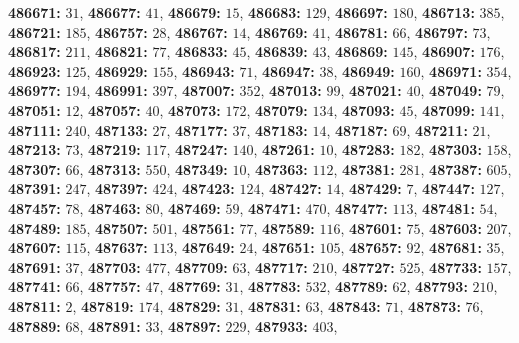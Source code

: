 \textsf{\bfseries 486671:} $31$, \textsf{\bfseries 486677:} $41$, \textsf{\bfseries 486679:} $15$, \textsf{\bfseries 486683:} $129$, \textsf{\bfseries 486697:} $180$, \textsf{\bfseries 486713:} $385$, \textsf{\bfseries 486721:} $185$, \textsf{\bfseries 486757:} $28$, \textsf{\bfseries 486767:} $14$, \textsf{\bfseries 486769:} $41$, \textsf{\bfseries 486781:} $66$, \textsf{\bfseries 486797:} $73$, \textsf{\bfseries 486817:} $211$, \textsf{\bfseries 486821:} $77$, \textsf{\bfseries 486833:} $45$, \textsf{\bfseries 486839:} $43$, \textsf{\bfseries 486869:} $145$, \textsf{\bfseries 486907:} $176$, \textsf{\bfseries 486923:} $125$, \textsf{\bfseries 486929:} $155$, \textsf{\bfseries 486943:} $71$, \textsf{\bfseries 486947:} $38$, \textsf{\bfseries 486949:} $160$, \textsf{\bfseries 486971:} $354$, \textsf{\bfseries 486977:} $194$, \textsf{\bfseries 486991:} $397$, \textsf{\bfseries 487007:} $352$, \textsf{\bfseries 487013:} $99$, \textsf{\bfseries 487021:} $40$, \textsf{\bfseries 487049:} $79$, \textsf{\bfseries 487051:} $12$, \textsf{\bfseries 487057:} $40$, \textsf{\bfseries 487073:} $172$, \textsf{\bfseries 487079:} $134$, \textsf{\bfseries 487093:} $45$, \textsf{\bfseries 487099:} $141$, \textsf{\bfseries 487111:} $240$, \textsf{\bfseries 487133:} $27$, \textsf{\bfseries 487177:} $37$, \textsf{\bfseries 487183:} $14$, \textsf{\bfseries 487187:} $69$, \textsf{\bfseries 487211:} $21$, \textsf{\bfseries 487213:} $73$, \textsf{\bfseries 487219:} $117$, \textsf{\bfseries 487247:} $140$, \textsf{\bfseries 487261:} $10$, \textsf{\bfseries 487283:} $182$, \textsf{\bfseries 487303:} $158$, \textsf{\bfseries 487307:} $66$, \textsf{\bfseries 487313:} $550$, \textsf{\bfseries 487349:} $10$, \textsf{\bfseries 487363:} $112$, \textsf{\bfseries 487381:} $281$, \textsf{\bfseries 487387:} $605$, \textsf{\bfseries 487391:} $247$, \textsf{\bfseries 487397:} $424$, \textsf{\bfseries 487423:} $124$, \textsf{\bfseries 487427:} $14$, \textsf{\bfseries 487429:} $7$, \textsf{\bfseries 487447:} $127$, \textsf{\bfseries 487457:} $78$, \textsf{\bfseries 487463:} $80$, \textsf{\bfseries 487469:} $59$, \textsf{\bfseries 487471:} $470$, \textsf{\bfseries 487477:} $113$, \textsf{\bfseries 487481:} $54$, \textsf{\bfseries 487489:} $185$, \textsf{\bfseries 487507:} $501$, \textsf{\bfseries 487561:} $77$, \textsf{\bfseries 487589:} $116$, \textsf{\bfseries 487601:} $75$, \textsf{\bfseries 487603:} $207$, \textsf{\bfseries 487607:} $115$, \textsf{\bfseries 487637:} $113$, \textsf{\bfseries 487649:} $24$, \textsf{\bfseries 487651:} $105$, \textsf{\bfseries 487657:} $92$, \textsf{\bfseries 487681:} $35$, \textsf{\bfseries 487691:} $37$, \textsf{\bfseries 487703:} $477$, \textsf{\bfseries 487709:} $63$, \textsf{\bfseries 487717:} $210$, \textsf{\bfseries 487727:} $525$, \textsf{\bfseries 487733:} $157$, \textsf{\bfseries 487741:} $66$, \textsf{\bfseries 487757:} $47$, \textsf{\bfseries 487769:} $31$, \textsf{\bfseries 487783:} $532$, \textsf{\bfseries 487789:} $62$, \textsf{\bfseries 487793:} $210$, \textsf{\bfseries 487811:} $2$, \textsf{\bfseries 487819:} $174$, \textsf{\bfseries 487829:} $31$, \textsf{\bfseries 487831:} $63$, \textsf{\bfseries 487843:} $71$, \textsf{\bfseries 487873:} $76$, \textsf{\bfseries 487889:} $68$, \textsf{\bfseries 487891:} $33$, \textsf{\bfseries 487897:} $229$, \textsf{\bfseries 487933:} $403$, 
